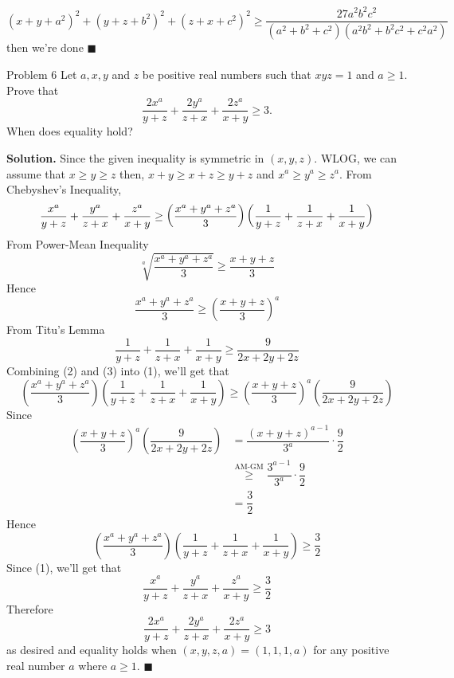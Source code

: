 \documentclass[12pt]{article}
\begin{document}
$$(x+y+a^2)^2 + (y+z+b^2)^2 + (z+x+c^2)^2\geq  \dfrac{27a^2b^2c^2}{(a^2+b^2+c^2)({a^2}{b^2}+{b^2}{c^2}+{c^2}{a^2})}$$
then we're done \null\hfill $\blacksquare$
\newpage
\begin{mybox}{Problem 6}
 Let $a,x,y$ and $z$ be positive real numbers such that $xyz=1$ and $a \geq 1$.  \\ Prove that  $$  \dfrac{2x^a}{y+z} + \dfrac{2y^a}{z+x} + \dfrac{2z^a}{x+y} \geq 3.$$ When does equality hold?
\end{mybox}
\textbf{Solution.} Since the given inequality is symmetric in $(x,y,z)$. WLOG, we can assume that $x \geq y \geq z$ then, $x+y \geq x+z \geq y+z$  and $x^a \geq y^a \geq z^a$. From Chebyshev's Inequality,
\begin{equation}\setcounter{equation}{1} 
\dfrac{x^a}{y+z} + \dfrac{y^a}{z+x} + \dfrac{z^a}{x+y} \geq \left(\dfrac{x^a+y^a+z^a}{3}\right)\left(\dfrac{1}{y+z} + \dfrac{1}{z+x} + \dfrac{1}{x+y}\right)
\end{equation}
From Power-Mean Inequality 
\begin{equation*} \sqrt[a]{\dfrac{x^a+y^a+z^a}{3}} \geq \dfrac{x+y+z}{3}
 \end{equation*}
Hence
\begin{equation} \dfrac{x^a+y^a+z^a}{3} \geq \left(\dfrac{x+y+z}{3}\right)^a \end{equation}
From Titu's Lemma
\begin{equation} \dfrac{1}{y+z} + \dfrac{1}{z+x} + \dfrac{1}{x+y} \geq  \dfrac{9}{2x+2y+2z} \end{equation}
Combining (2) and (3) into (1), we'll get that 
$$\left(\dfrac{x^a+y^a+z^a}{3}\right)\left(\dfrac{1}{y+z} + \dfrac{1}{z+x} + \dfrac{1}{x+y}\right) \geq \left(\dfrac{x+y+z}{3}\right)^a\left(\dfrac{9}{2x+2y+2z}\right)$$
Since
\begin{align*}
\left(\dfrac{x+y+z}{3}\right)^a\left(\dfrac{9}{2x+2y+2z}\right) 
&= \dfrac{(x+y+z)^{a-1}}{3^a}\cdot\dfrac{9}{2}\\
&\stackrel{\text{AM-GM}}{\geq} \dfrac{3^{a-1}}{3^a}\cdot\dfrac{9}{2}\\
&= \dfrac{3}{2}
\end{align*}
Hence $$\left(\dfrac{x^a+y^a+z^a}{3}\right)\left(\dfrac{1}{y+z} + \dfrac{1}{z+x} + \dfrac{1}{x+y}\right) \geq \dfrac{3}{2}$$
\newpage
Since (1), we'll get that
$$\dfrac{x^a}{y+z} + \dfrac{y^a}{z+x} + \dfrac{z^a}{x+y} \geq \dfrac{3}{2}$$
Therefore
$$\dfrac{2x^a}{y+z} + \dfrac{2y^a}{z+x} + \dfrac{2z^a}{x+y} \geq 3$$ as desired and equality holds when $(x,y,z,a)=(1,1,1,a)$ for any positive real number $a$ where $a \geq 1$.  \null\hfill $\blacksquare$
\end{document}
